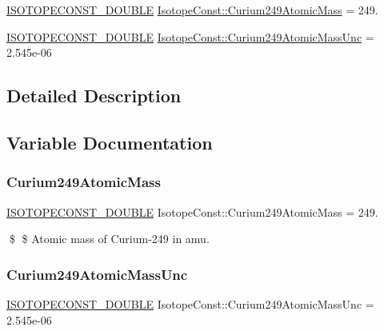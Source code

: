 \begin{DoxyCompactItemize}
\item 
\mbox{\hyperlink{group___isotope_const-_macros_ga8f45a7272ce02c0b4c65c44636ed719a}{I\+S\+O\+T\+O\+P\+E\+C\+O\+N\+S\+T\+\_\+\+D\+O\+U\+B\+LE}} \mbox{\hyperlink{group___isotope_const-_curium-_cm249_ga8b18d2ff709495fc9b3423712c6e0a99}{Isotope\+Const\+::\+Curium249\+Atomic\+Mass}} = 249.
\item 
\mbox{\hyperlink{group___isotope_const-_macros_ga8f45a7272ce02c0b4c65c44636ed719a}{I\+S\+O\+T\+O\+P\+E\+C\+O\+N\+S\+T\+\_\+\+D\+O\+U\+B\+LE}} \mbox{\hyperlink{group___isotope_const-_curium-_cm249_ga246c493792e7379cd4ce0a49456d15fe}{Isotope\+Const\+::\+Curium249\+Atomic\+Mass\+Unc}} = 2.\+545e-\/06
\end{DoxyCompactItemize}


\subsection{Detailed Description}


\subsection{Variable Documentation}
\mbox{\label{group___isotope_const-_curium-_cm249_ga8b18d2ff709495fc9b3423712c6e0a99}} 
\subsubsection{\texorpdfstring{Curium249\+Atomic\+Mass}{Curium249AtomicMass}}
{\footnotesize\ttfamily \mbox{\hyperlink{group___isotope_const-_macros_ga8f45a7272ce02c0b4c65c44636ed719a}{I\+S\+O\+T\+O\+P\+E\+C\+O\+N\+S\+T\+\_\+\+D\+O\+U\+B\+LE}} Isotope\+Const\+::\+Curium249\+Atomic\+Mass = 249.}

\$ \$ Atomic mass of Curium-\/249 in amu. \mbox{\label{group___isotope_const-_curium-_cm249_ga246c493792e7379cd4ce0a49456d15fe}} 
\subsubsection{\texorpdfstring{Curium249\+Atomic\+Mass\+Unc}{Curium249AtomicMassUnc}}
{\footnotesize\ttfamily \mbox{\hyperlink{group___isotope_const-_macros_ga8f45a7272ce02c0b4c65c44636ed719a}{I\+S\+O\+T\+O\+P\+E\+C\+O\+N\+S\+T\+\_\+\+D\+O\+U\+B\+LE}} Isotope\+Const\+::\+Curium249\+Atomic\+Mass\+Unc = 2.\+545e-\/06}

